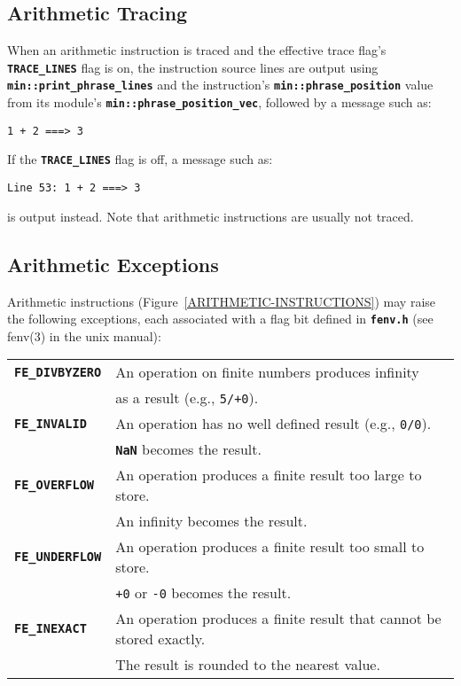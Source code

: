 \documentclass[12pt]{article}
\makeatletter
\newcommand{\TT}[1]{{\tt \bfseries #1}}
\newcommand{\ttkey}[1]{\TT{#1}\index{#1@{\tt #1}}}
\newcommand{\EOL}{\penalty \exhyphenpenalty}
\makeatother
\begin{document}
\subsection{Arithmetic Tracing}
\label{ARITHMETIC-TRACING}

When an arithmetic instruction is traced and the effective
trace flag's \TT{TRACE\_LINES} flag is on,
the instruction source lines are output
using \TT{min::\EOL print\_\EOL phrase\_\EOL lines} and the
instruction's \TT{min::\EOL phrase\_\EOL position} value from its module's
\TT{min::phrase\_\EOL position\_\EOL vec}, followed by
a message such as:
\begin{center}
\tt 1 + 2 ===> 3
\end{center}
If the \TT{TRACE\_LINES} flag is off, a message such as:
\begin{center}
\tt Line 53: 1 + 2 ===> 3
\end{center}
is output instead.
Note that arithmetic instructions are usually not traced.

\subsection{Arithmetic Exceptions}
\label{ARITHMETIC-EXCEPTIONS}

Arithmetic instructions (Figure~\ref{ARITHMETIC-INSTRUCTIONS})
may raise the following exceptions, each
associated with a flag bit defined in \TT{fenv.h}
(see fenv(3) in the unix manual):
\begin{center}
\begin{tabular}{|l|l|}
\hline
\ttkey{FE\_DIVBYZERO} &  An operation on finite numbers produces infinity \\
                      &  as a result (e.g., {\tt 5/+0}).
\\\hline
\ttkey{FE\_INVALID} & An operation has no well defined result
                      (e.g., {\tt 0/0}). \\
		    & \TT{NaN} becomes the result.
\\\hline
\ttkey{FE\_OVERFLOW} & An operation produces a finite result too large to
                       store. \\
		     & An infinity becomes the result.
\\\hline
\ttkey{FE\_UNDERFLOW} & An operation produces a finite result too small to
                        store. \\
	              & {\tt +0} or {\tt -0} becomes the result.
\\\hline
\ttkey{FE\_INEXACT} & An operation produces a finite result that cannot
                      be stored exactly. \\
		    & The result is rounded to the nearest value.
\\\hline
\end{tabular}
\end{center}
\end{document}
